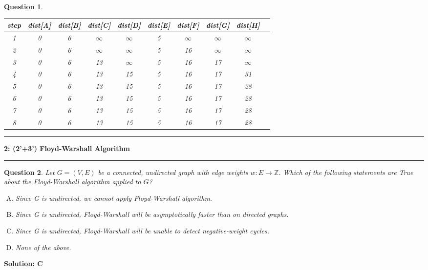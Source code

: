 \documentclass[10.5pt]{article}
\newcommand\question[2]{\vspace{.25in}\hrule\textbf{#1: #2}\vspace{.5em}\hrule\vspace{.10in}}
\newtheorem{Q}{Question}
\begin{document}
\begin{Q}
	\begin{table}[htbp]
		\begin{center}  
			\begin{tabular}{|c|c|c|c|c|c|c|c|c| p{3cm}|}  
				\hline  
				step & dist[A] & dist[B] & dist[C] & dist[D] & dist[E] & dist[F] & dist[G] & dist[H]\\ \hline  
				1 &0   &6   &$\infty$   & $\infty$   &5   & $\infty$    & $\infty$   & $\infty$  \\ \hline    
				2 &0   &6   & $\infty$   & $\infty$   &5   &16   & $\infty$   & $\infty$  \\ \hline    
				3 &0   &6   &13   & $\infty$   &5   &16   &17   & $\infty$  \\ \hline    
				4 &0   &6   &13   &15   &5   &16   &17   &31  \\ \hline    
				5 &0   &6   &13   &15   &5   &16   &17   &28  \\ \hline   
				6 &0   &6   &13   &15   &5   &16   &17   &28  \\ \hline    
				7 &0   &6   &13   &15   &5   &16   &17   &28  \\ \hline   
				8 &0   &6   &13   &15   &5   &16   &17   &28  \\  
				\hline  
			\end{tabular}  
		\end{center}  
	\end{table}
\end{Q}
\pagebreak
\question{2}{(2'+3') Floyd-Warshall Algorithm}	
\begin{Q}
	Let $G=(V,E)$ be a connected, undirected graph with edge weights $w:E\rightarrow \mathbb{Z}$. Which of the following statements are True about the Floyd-Warshall algorithm applied to $G$?
	\begin{enumerate}[(A)]
		\item Since G is undirected, we cannot apply Floyd-Warshall algorithm.
		\item Since G is undirected, Floyd-Warshall will be asymptotically faster than on directed graphs.
		\item Since G is undirected, Floyd-Warshall will be unable to detect negative-weight cycles.
		\item None of the above.
	\end{enumerate}
\end{Q}
\par\textbf{Solution: C}
\pagebreak
\end{document}
